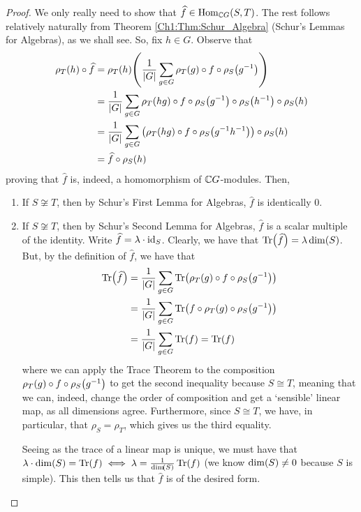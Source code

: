 \begin{proof}
    We only really need to show that $\widehat{f} \in \operatorname{Hom}_{\mathbb{C} G}(S, T)$. The rest follows relatively naturally from Theorem \ref{Ch1:Thm:Schur_Algebra} (Schur's Lemmas for Algebras), as we shall see. So, fix $h \in G$. Observe that
    \begin{align*}
        \rho_T(h) \circ \widehat{f} &= \rho_T(h)\!\left( \frac{1}{\left\lvert G \right\rvert} \sum_{g \in G} \rho_T(g) \circ f \circ \rho_S\!\left( g^{-1} \right) \right) \\
        &= \frac{1}{\left\lvert G \right\rvert} \sum_{g \in G} \rho_T(hg) \circ f \circ \rho_S\!\left( g^{-1} \right) \circ \rho_S\!\left( h^{-1} \right) \circ \rho_S(h) \\
        &= \frac{1}{\left\lvert G \right\rvert} \sum_{g \in G} \left( \rho_T(hg) \circ f \circ \rho_S\!\left( g^{-1} h^{-1} \right) \right) \circ \rho_S(h) \\
        &= \widehat{f} \circ \rho_S(h)
    \end{align*}
    proving that $\hat{f}$ is, indeed, a homomorphism of $\mathbb{C} G$-modules. Then,
    \begin{enumerate}
        \item If $S \not\cong T$, then by Schur's First Lemma for Algebras, $\hat{f}$ is identically $0$.
        \item If $S \not\cong T$, then by Schur's Second Lemma for Algebras, $\hat{f}$ is a scalar multiple of the identity. Write $\widehat{f} = \lambda \cdot \operatorname{id}_S$. Clearly, we have that $\operatorname{Tr}\!\left( \widehat{f} \right) = \lambda \dim\!\left( S \right)$. But, by the definition of $\hat{f}$, we have that
        \begin{align*}
            \Tr{\hat{f}} &= \frac{1}{\abs{G}} \sum_{g \in G} \Tr{\rho_T(g) \circ f \circ \rho_S\!\parenth{g\inv}} \\
            &= \frac{1}{\abs{G}} \sum_{g \in G} \Tr{f \circ \rho_T\!\parenth{g} \circ \rho_S\!\parenth{g\inv}} \\
            &= \frac{1}{\abs{G}} \sum_{g \in G} \Tr{f} = \Tr{f}
        \end{align*}
        where we can apply the Trace Theorem to the composition $\rho_T(g) \circ f \circ \rho_S\!\left( g^{-1} \right)$ to get the second inequality because $S \cong T$, meaning that we can, indeed, change the order of composition and get a `sensible' linear map, as all dimensions agree. Furthermore, since $S \cong T$, we have, in particular, that $\rho_S = \rho_T$, which gives us the third equality.
        
        Seeing as the trace of a linear map is unique, we must have that $\lambda \cdot \dim\!\left( S \right) = \operatorname{Tr}\!\left( f \right) \iff \lambda = \frac{1}{\dim\!\left( S \right)} \operatorname{Tr}\!\left( f \right)$ (we know $\dim\!\left( S \right) \neq 0$ because $S$ is simple). This then tells us that $\hat{f}$ is of the desired form.
    \end{enumerate}
\end{proof}
